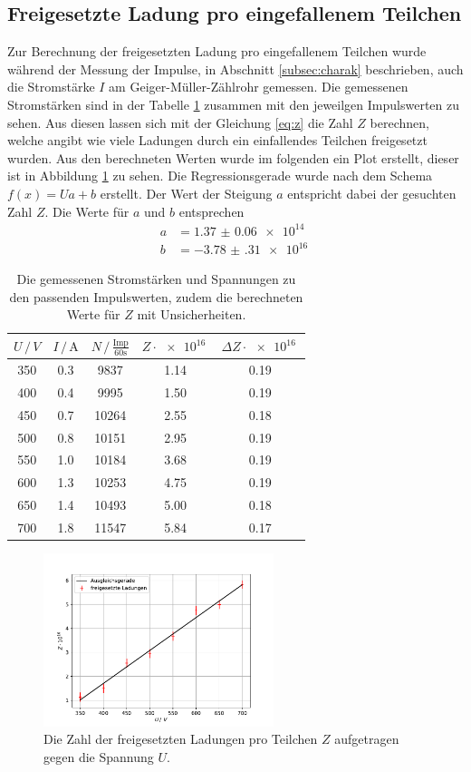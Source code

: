 \subsection{Freigesetzte Ladung pro eingefallenem Teilchen}
Zur Berechnung der freigesetzten Ladung pro eingefallenem Teilchen wurde während der Messung der Impulse, in Abschnitt \ref{subsec:charak} beschrieben, auch die Stromstärke $I$ am Geiger-Müller-Zählrohr gemessen.
Die gemessenen Stromstärken sind in der Tabelle \ref{tab:strom} zusammen mit den jeweilgen Impulswerten zu sehen.
Aus diesen lassen sich mit der Gleichung \eqref{eq:z} die Zahl $Z$ berechnen, welche angibt wie viele Ladungen durch ein einfallendes Teilchen freigesetzt wurden.
Aus den berechneten Werten wurde im folgenden ein Plot erstellt, dieser ist in Abbildung \ref{fig:z} zu sehen.
Die Regressionsgerade wurde nach dem Schema $f(x)=Ua+b$ erstellt.
Der Wert der Steigung $a$ entspricht dabei der gesuchten Zahl $Z$.
Die Werte für $a$ und $b$ entsprechen
\begin{align*}
  a &= \SI{1.37(6)e+14}{} \\
  b &= \SI{-3.78(31)e+16}{}
\end{align*}
\begin{table}
  \centering
  \caption{Die gemessenen Stromstärken und Spannungen zu den passenden Impulswerten, zudem die berechneten Werte für $Z$ mit Unsicherheiten.}
  \begin{tabular}[t]{ccccc}
    \toprule
    $U\,/\, \si{V} $ &$I \, /\, \si{\A}$ & $N \,/\, \frac{\text{Imp}}{\si{60\second}}$& $Z\cdot\SI{e16}{}$ & $\Delta Z\cdot\SI{e16}{}$\\
    \midrule
    350 & 0.3 & 9837  & 1.14 & 0.19 \\
    400 & 0.4 & 9995  & 1.50 & 0.19 \\
    450 & 0.7 & 10264 & 2.55 & 0.18  \\
    500 & 0.8 & 10151 & 2.95 & 0.19  \\
    550 & 1.0 & 10184 & 3.68 & 0.19  \\
    600 & 1.3 & 10253 & 4.75 & 0.19  \\
    650 & 1.4 & 10493 & 5.00 & 0.18  \\
    700 & 1.8 & 11547 & 5.84 & 0.17  \\
    \bottomrule
    \end{tabular}
  \label{tab:strom}
\end{table}

\begin{figure}
  \centering
  \includegraphics[width=0.6\textwidth]{content/data/zaehlstrom.pdf}
  \caption{Die Zahl der freigesetzten Ladungen pro Teilchen $Z$ aufgetragen gegen die Spannung $U$.}
  \label{fig:z}
\end{figure}